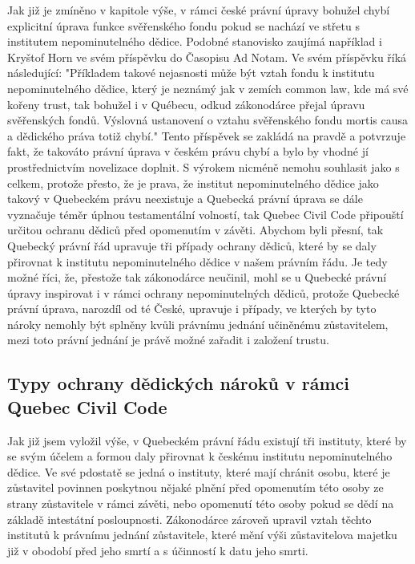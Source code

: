 \documentclass{article}
\begin{document}
Jak již je zmíněno v kapitole výše, v rámci české právní úpravy bohužel chybí explicitní úprava funkce svěřenského fondu pokud se nachází ve střetu s institutem nepominutelného dědice. Podobné stanovisko zaujímá například i Kryštof Horn ve svém příspěvku do Časopisu Ad Notam. Ve svém příspěvku říká následující: "Příkladem takové nejasnosti může být vztah fondu k institutu nepominutelného dědice, který je neznámý jak v zemích common law, kde má své kořeny trust, tak bohužel i v Québecu, odkud zákonodárce přejal úpravu svěřenských fondů. Výslovná ustanovení o vztahu svěřenského fondu mortis causa a dědického práva totiž chybí."  Tento příspěvek se zakládá na pravdě a potvrzuje fakt, že takováto právní úprava v českém právu chybí a bylo by vhodné jí prostřednictvím novelizace doplnit. S výrokem nicméně nemohu souhlasit jako s celkem, protože přesto, že je prava, že institut nepominutelného dědice jako takový v Quebeckém právu neexistuje a Quebecká právní úprava se dále vyznačuje téměr úplnou testamentální volností, tak Quebec Civil Code připouští určitou ochranu dědiců před opomenutím v závěti. Abychom byli přesní, tak Quebecký právní řád upravuje tři případy ochrany dědiců, které by se daly přirovnat k institutu nepominutelného dědice v našem právním řádu. Je tedy možné říci, že, přestože tak zákonodárce neučinil, mohl se u Quebecké právní úpravy inspirovat i v rámci ochrany nepominutelných dědiců, protože Quebecké právní úprava, narozdíl od té České, upravuje i případy, ve kterých by tyto nároky nemohly být splněny kvůli právnímu jednání učiněnému zůstavitelem, mezi toto právní jednání je právě možné zařadit i založení trustu. \\

\newpage

\subsection{Typy ochrany dědických nároků v rámci Quebec Civil Code}

Jak již jsem vyložil výše, v Quebeckém právní řádu existují tři instituty, které by se svým účelem a formou daly přirovnat k českému institutu nepominutelného dědice. Ve své pdostatě se jedná o instituty, které mají chránit osobu, které je zůstavitel povinnen poskytnou nějaké plnění před opomenutím této osoby ze strany zůstavitele v rámci závěti, nebo opomenutí této osoby pokud se dědí na základě intestátní posloupnosti. Zákonodárce zároveň upravil vztah těchto institutů k právnímu jednání zůstavitele, které mění výši zůstavitelova majetku již v obodobí před jeho smrtí a s účinností k datu jeho smrti. \\
\end{document}
